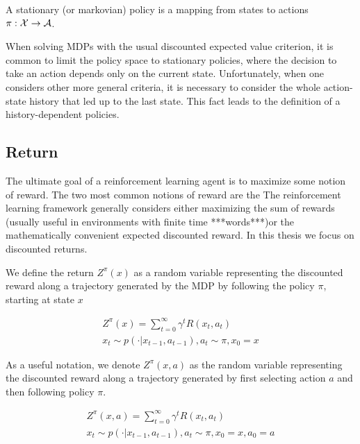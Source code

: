 \begin{definition}
A stationary (or markovian) policy is a mapping from states to actions $\pi:\mathcal{X} \to \mathcal{A}$.
\end{definition}

When solving MDPs with the usual discounted expected value criterion, it is common to limit the policy space to stationary policies, where the decision to take an action depends only on the current state. Unfortunately, when one considers other more general criteria, it is necessary to consider the whole action-state history that led up to the last state. This fact leads to the definition of a history-dependent policies.

\subsection{Return}

The ultimate goal of a reinforcement learning agent is to maximize some notion of reward. The two most common notions of reward are the 
The reinforcement learning framework generally considers either maximizing the sum of rewards (usually useful in environments with finite time ***words***)or the mathematically convenient expected discounted reward. In this thesis we focus on discounted returns.



We define the return $Z^\pi(x)$ as a random variable representing the discounted reward along a trajectory generated by the MDP by following the policy $\pi$, starting at state $x$

\begin{equation}
\begin{split}
Z^\pi(x)=\sum_{t=0}^\infty \gamma^tR(x_t,a_t)\\
x_t \sim p(\cdot|x_{t-1}, a_{t-1}), a_t \sim \pi, x_0 = x
\end{split}
\end{equation}

As a useful notation, we denote $Z^\pi(x, a)$ as the random variable representing the discounted reward along a trajectory generated by first selecting action $a$ and then following policy $\pi$.

\begin{equation}
\begin{split}
Z^\pi(x, a)=\sum_{t=0}^\infty \gamma^tR(x_t,a_t)\\
x_t \sim p(\cdot|x_{t-1}, a_{t-1}), a_t \sim \pi, x_0 = x, a_0 = a
\end{split}
\end{equation}

